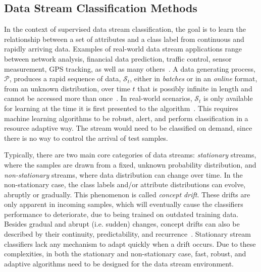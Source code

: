 \documentclass[reqno]{vcuthesis}
\newcommand{\proc}{{\mathcal P}}
\numberwithin{equation}{chapter}
\begin{document}
\subsection{Data Stream Classification Methods}
In the context of supervised data stream classification, the goal is to learn the relationship between a set of attributes and a class label from continuous and rapidly arriving data. Examples of real-world data stream applications range between network analysis, financial data prediction, traffic control, sensor measurement, GPS tracking, as well as many others~\cite{moacite,gaber2007survey,krawczyk2017ensemble}. A data generating process, $\proc$, produces a rapid sequence of data, $\mathcal{S}_t$, either in \textit{batches} or in an \textit{online} format, from an unknown distribution, over time $t$ that is possibly infinite in length and cannot be accessed more than once~\cite{zang2014comparative}. In real-world scenarios, $\mathcal{S}_t$ is only available for learning at the time it is first presented to the algorithm~\cite{bifet2009new}. This requires machine learning algorithms to be robust, alert, and perform classification in a resource adaptive way. The stream would need to be classified on demand, since there is no way to control the arrival of test samples. 

Typically, there are two main core categories of data streams: \textit{stationary} streams, where the samples are drawn from a fixed, unknown probability distribution, and \textit{non-stationary} streams, where data distribution can change over time. In the non-stationary case, the class labels and/or attribute distributions can evolve, abruptly or gradually. This phenomenon is called \textit{concept drift}. These drifts are only apparent in incoming samples, which will eventually cause the classifiers performance to deteriorate, due to being trained on outdated training data. Besides gradual and abrupt (i.e. sudden) changes, concept drifts can also be described by their continuity, predictability, and recurrence~\cite{krawczyk2017ensemble,webb2016characterizing}. Stationary stream classifiers lack any mechanism to adapt quickly when a drift occurs. Due to these complexities, in both the stationary and non-stationary case, fast, robust, and adaptive algorithms need to be designed for the data stream environment. 
\end{document}
